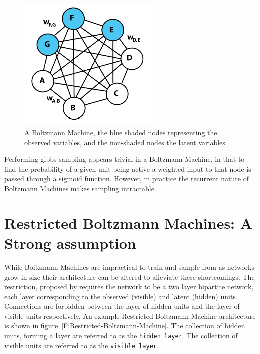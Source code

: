 
  \begin{figure}[h]
  \begin{center}
    \includegraphics[width = 0.6\textwidth]{Assets/Boltzmann_Machine.png}
  \caption{A Boltzmann Machine, the blue shaded nodes representing the observed variables, and the non-shaded nodes the latent variables.}
  \label{F:Boltzmann-Machine}
  \end{center}
  \end{figure}

  Performing gibbs sampling appears trivial in a Boltzmann Machine, in that to find the probability of a given unit being active a weighted input to that node is passed through a sigmoid function. However, in practice the recurrent nature of Boltzmann Machines makes sampling intractable.



  \section{Restricted Boltzmann Machines: A Strong assumption}

  While Boltzmann Machines are impractical to train and sample from as networks grow in size  their architecture can be altered to alieviate these shortcomings. The restriction, proposed by  requires the network to be a two layer bipartite network, each layer corresponding to the observed (visible) and latent (hidden) units. Connections are forbidden between the layer of hidden units and the layer of visible units respectively. An example Restricted Boltzmann Machine architecture is shown in figure~\ref{F:Restricted-Boltzmann-Machine}. The collection of hidden units, forming a layer are referred to as the \texttt{hidden layer}. The collection of visible units are referred to as the \texttt{visible layer}.

